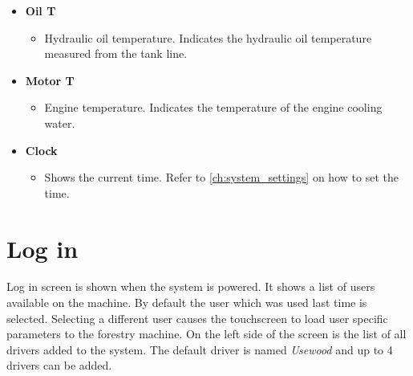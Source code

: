 \documentclass[12pt,a4paper,english]{uvmanual}
\begin{document}
\begin{itemize}
 \item \textbf{Oil T}
 \begin{itemize}
  \item Hydraulic oil temperature. Indicates the hydraulic oil temperature measured from the tank line. 
 \end{itemize}
 
 \item \textbf{Motor T}
 \begin{itemize}
  \item Engine temperature. Indicates the temperature of the engine cooling water.
 \end{itemize}
 
 \item \textbf{Clock}
 \begin{itemize}
  \item Shows the current time. Refer to \autoref{ch:system_settings} on how to set the time.
 \end{itemize}

\end{itemize}


\chapter{Log in}\label{ch:login}

Log in screen is shown when the system is powered. It shows a list of users available on the machine. By default the user which was used last time is selected. Selecting a different user causes the touchscreen to load user specific parameters to the forestry machine. On the left side of the screen is the list of all drivers added to the system. The default driver is named \textit{Usewood} and up to 4 drivers can be added.

\end{document}

